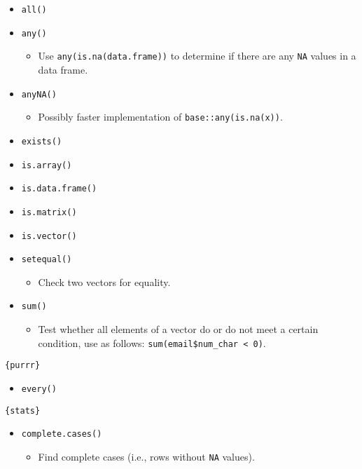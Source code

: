 \documentclass[
]{book}
\providecommand{\tightlist}{%
  \setlength{\itemsep}{0pt}\setlength{\parskip}{0pt}}
\begin{document}
\begin{itemize}
\tightlist
\item
  \texttt{all()}
\item
  \texttt{any()}

  \begin{itemize}
  \tightlist
  \item
    Use \texttt{any(is.na(data.frame))} to determine if there are any \texttt{NA} values in a data frame.
  \end{itemize}
\item
  \texttt{anyNA()}

  \begin{itemize}
  \tightlist
  \item
    Possibly faster implementation of \texttt{base::any(is.na(x))}.
  \end{itemize}
\item
  \texttt{exists()}
\item
  \texttt{is.array()}
\item
  \texttt{is.data.frame()}
\item
  \texttt{is.matrix()}
\item
  \texttt{is.vector()}
\item
  \texttt{setequal()}

  \begin{itemize}
  \tightlist
  \item
    Check two vectors for equality.
  \end{itemize}
\item
  \texttt{sum()}

  \begin{itemize}
  \tightlist
  \item
    Test whether all elements of a vector do or do not meet a certain condition, use as follows: \texttt{sum(email\$num\_char\ \textless{}\ 0)}.
  \end{itemize}
\end{itemize}

\texttt{\{purrr\}}

\begin{itemize}
\tightlist
\item
  \texttt{every()}
\end{itemize}

\texttt{\{stats\}}

\begin{itemize}
\tightlist
\item
  \texttt{complete.cases()}

  \begin{itemize}
  \tightlist
  \item
    Find complete cases (i.e., rows without \texttt{NA} values).
  \end{itemize}
\end{itemize}
\end{document}
